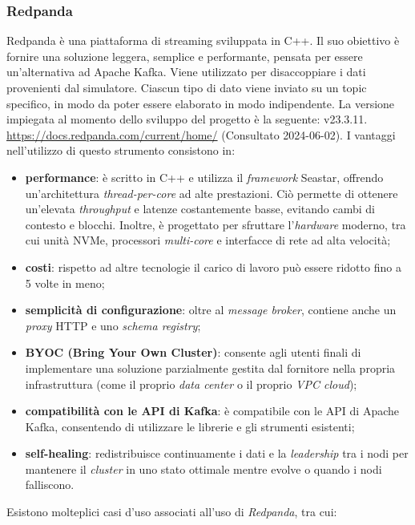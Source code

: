\subsubsection{Redpanda}
Redpanda è una piattaforma di streaming sviluppata in C++. Il suo obiettivo è fornire una soluzione leggera, semplice e performante, pensata per essere un'alternativa ad Apache Kafka. Viene utilizzato per disaccoppiare i dati provenienti dal simulatore. Ciascun tipo di dato viene inviato su un topic specifico, in modo da poter essere elaborato in modo indipendente.
La versione impiegata al momento dello sviluppo del progetto è la seguente: v23.3.11.
\url{https://docs.redpanda.com/current/home/} (Consultato 2024-06-02).
I vantaggi nell'utilizzo di questo strumento consistono in:
\begin{itemize}
	\item \textbf{performance}: è scritto in C++ e utilizza il \textit{framework} Seastar, offrendo un'architettura \textit{thread-per-core} ad alte prestazioni.
    Ciò permette di ottenere un'elevata \textit{throughput} e latenze costantemente basse, evitando cambi di contesto e blocchi.
    Inoltre, è progettato per sfruttare l'\textit{hardware} moderno, tra cui unità NVMe, processori \textit{multi-core} e interfacce di rete ad alta velocità;
    \item \textbf{costi}: rispetto ad altre tecnologie il carico di lavoro può essere ridotto fino a 5 volte in meno;
    \item \textbf{semplicità di configurazione}: oltre al \textit{message broker}, contiene anche un \textit{proxy} HTTP e uno \textit{schema registry};
    \item \textbf{BYOC (Bring Your Own Cluster)}: consente agli utenti finali di implementare una soluzione parzialmente gestita dal fornitore nella propria infrastruttura (come il proprio \textit{data center} o il proprio \textit{VPC cloud});
    \item \textbf{compatibilità con le API di Kafka}: è compatibile con le API di Apache Kafka, consentendo di utilizzare le librerie e gli strumenti esistenti;
    \item \textbf{self-healing}: redistribuisce continuamente i dati e la \textit{leadership} tra i nodi per mantenere il \textit{cluster} in uno stato ottimale mentre evolve o quando i nodi falliscono.
\end{itemize}
Esistono molteplici casi d'uso associati all'uso di \textit{Redpanda}, tra cui:
